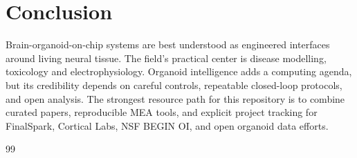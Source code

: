 \documentclass[10pt,twocolumn]{article}
\begin{document}
\section{Conclusion}

Brain-organoid-on-chip systems are best understood as engineered interfaces around living neural tissue. The field's practical center is disease modelling, toxicology and electrophysiology. Organoid intelligence adds a computing agenda, but its credibility depends on careful controls, repeatable closed-loop protocols, and open analysis. The strongest resource path for this repository is to combine curated papers, reproducible MEA tools, and explicit project tracking for FinalSpark, Cortical Labs, NSF BEGIN OI, and open organoid data efforts.

\begin{thebibliography}{99}\small


\end{thebibliography}
\end{document}
